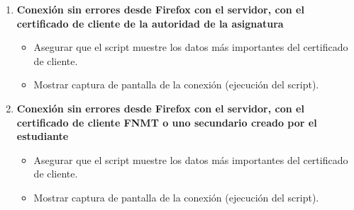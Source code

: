 \begin{enumerate}
    \begin{itemize}
        \item Ejecutar el siguiente comando para verificar la conexión y los certificados:
        \[
        \texttt{openssl s\_client www.ejemplo.com:443 -cert certcliente.pem -key certcliente.key -CAfile cert\_raiz.pem}
        \]
        \item Verificar que no se producen errores en la conexión ni en los certificados.
        \item Verificar que NO hay errores en \texttt{error\_log}.
    \end{itemize}
    \item \textbf{Conexión sin errores desde Firefox con el servidor, con el certificado de cliente de la autoridad de la asignatura}
    \begin{itemize}
        \item Asegurar que el script muestre los datos más importantes del certificado de cliente.
        \item Mostrar captura de pantalla de la conexión (ejecución del script).
    \end{itemize}
    \item \textbf{Conexión sin errores desde Firefox con el servidor, con el certificado de cliente FNMT o uno secundario creado por el estudiante}
    \begin{itemize}
        \item Asegurar que el script muestre los datos más importantes del certificado de cliente.
        \item Mostrar captura de pantalla de la conexión (ejecución del script).
    \end{itemize}
\end{enumerate}
